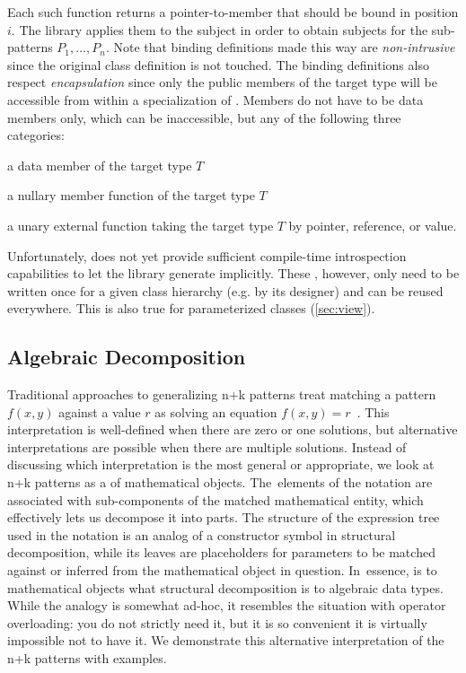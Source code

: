 \noindent
Each such function returns a pointer-to-member that should be bound in 
position $i$. The library applies them to the subject in order to obtain 
subjects for the sub-patterns $P_1,...,P_n$. 
Note that binding definitions made this way  
are \emph{non-intrusive} since the original class definition is not touched. 
The binding definitions also respect \emph{encapsulation} since only the public members of the 
target type will be accessible from within a specialization of . 
Members do not have to be data members only, which can be inaccessible, but any 
of the following three categories:

\begin{compactitem}
\setlength{\itemsep}{0pt}
\setlength{\parskip}{0pt}
\item a data member of the target type $T$
\item a nullary member function of the target type $T$
\item a unary external function taking the target type $T$ by pointer, reference, or value.
\end{compactitem}

\noindent
Unfortunately, \Cpp{} does not yet provide sufficient compile-time 
introspection capabilities to let the library generate  
implicitly. These , however, only need to be written once for 
a given class hierarchy (e.g. by its designer) and can be reused everywhere. 
This is also true for parameterized classes (\textsection\ref{sec:view}). 

\subsection{Algebraic Decomposition}
\label{sec:slv}

Traditional approaches to generalizing n+k patterns treat matching a pattern 
$f(x,y)$ against a value $r$ as solving an equation $f(x,y)=r$~\cite{OosterhofThesis}. 
This interpretation is well-defined when there are zero or one solutions,
but alternative interpretations are possible when there are multiple solutions. 
Instead of discussing which interpretation is the most general or appropriate, 
we look at n+k patterns as a  of 
mathematical objects. The~elements of the notation are associated with 
sub-components of the matched mathematical entity, which effectively lets us 
decompose it into parts. The structure of the expression tree used in the notation
is an analog of a constructor symbol in structural decomposition, while its 
leaves are placeholders for parameters to be matched against or inferred from 
the mathematical object in question. In~essence,  
is to mathematical objects what structural decomposition is to algebraic data 
types. While the analogy is somewhat ad-hoc, it resembles the situation with 
operator overloading: you do not strictly need it, but it is so %
convenient it is virtually impossible not to have it. We demonstrate this 
alternative interpretation of the n+k patterns with examples.

